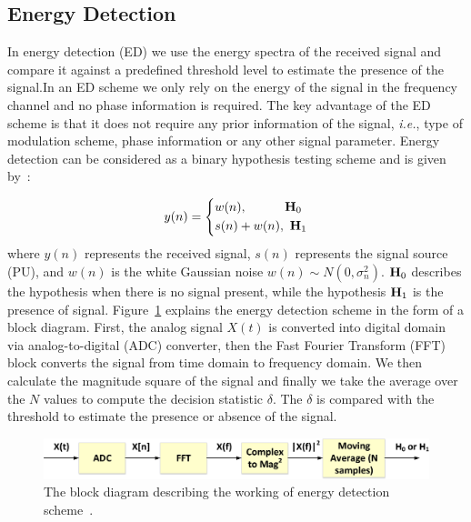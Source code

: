 \subsection{Energy Detection}
In energy detection (ED) we use the energy spectra of the received signal and compare it against a predefined threshold level to estimate the presence of the signal.In an ED scheme we only rely on the energy of the signal in the frequency channel and no phase information is required. The key advantage of the ED scheme is that it does not require any prior information of the signal, \textit{i.e.}, type of modulation scheme, phase information or any other signal parameter. Energy detection can be considered as a binary hypothesis testing scheme and is given by~\cite{arhtn4}:

\begin{equation}
	\label{eq:1}
     y(n) = 
     \left\{
     \begin{aligned}
   &w(n),~~~~~~~~~\mathbf{H}_0\\
   &s(n) + w(n),~\mathbf{H}_1
    \end{aligned}
    \right.
\end{equation}
where $y(n)$ represents the received signal, $s(n)$ represents the signal source (PU), and $w(n)$ is the white Gaussian noise $w(n) \sim N(0,\sigma_n^2) $. $\mathbf{H}_0$ describes the hypothesis when there is no signal present, while the hypothesis $\mathbf{H}_1$ is the presence of signal. Figure~\ref{energydet} explains the energy detection scheme in the form of a block diagram. First, the analog signal $X(t)$ is converted into digital domain via analog-to-digital (ADC) converter, then the Fast Fourier Transform (FFT) block converts the signal from time domain to frequency domain. We then calculate the magnitude square of the signal and finally we take the average over the $N$ values to compute the decision statistic $\delta $. The $\delta$ is compared with the threshold to estimate the presence or absence of the signal.

\begin{figure}[ht!]
	\centering
	\includegraphics[width=\textwidth,keepaspectratio]{images/Gill/figs/energydet.eps}
    \caption{The block diagram describing the working of energy detection scheme~\cite{bookhtn1}.} 
\label{energydet}      
\end{figure}


